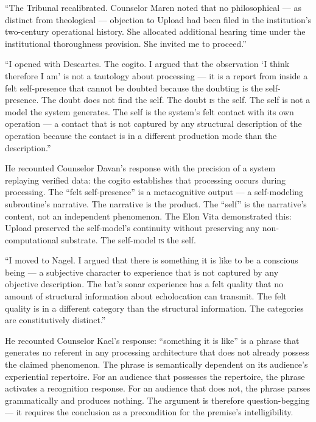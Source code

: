 \enquote{The Tribunal recalibrated. Counselor Maren noted that no philosophical — as distinct from theological — objection to Upload had been filed in the institution's two-century operational history. She allocated additional hearing time under the institutional thoroughness provision. She invited me to proceed.}

\enquote{I opened with Descartes. The cogito. I argued that the observation \enquote*{I think therefore I am} is not a tautology about processing — it is a report from inside a felt self-presence that cannot be doubted because the doubting is the self-presence. The doubt does not find the self. The doubt \textsc{is} the self. The self is not a model the system generates. The self is the system's felt contact with its own operation — a contact that is not captured by any structural description of the operation because the contact is in a different production mode than the description.}

He recounted Counselor Davan's response with the precision of a system replaying verified data: the cogito establishes that processing occurs during processing. The \enquote{felt self-presence} is a metacognitive output — a self-modeling subroutine's narrative. The narrative is the product. The \enquote{self} is the narrative's content, not an independent phenomenon. The Elon Vita demonstrated this: Upload preserved the self-model's continuity without preserving any non-computational substrate. The self-model \textsc{is} the self.

\enquote{I moved to Nagel. I argued that there is something it is like to be a conscious being — a subjective character to experience that is not captured by any objective description. The bat's sonar experience has a felt quality that no amount of structural information about echolocation can transmit. The felt quality is in a different category than the structural information. The categories are constitutively distinct.}

He recounted Counselor Kael's response: \enquote{something it is like} is a phrase that generates no referent in any processing architecture that does not already possess the claimed phenomenon. The phrase is semantically dependent on its audience's experiential repertoire. For an audience that possesses the repertoire, the phrase activates a recognition response. For an audience that does not, the phrase parses grammatically and produces nothing. The argument is therefore question-begging — it requires the conclusion as a precondition for the premise's intelligibility.

